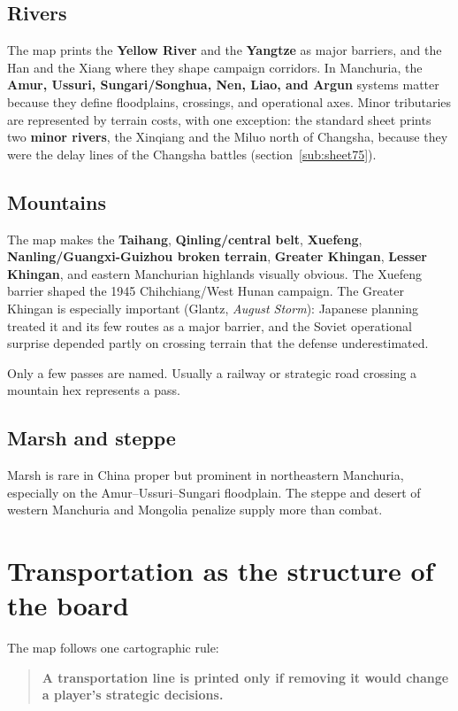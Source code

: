 \documentclass[11pt]{article}
\begin{document}
\subsection{Rivers}
The map prints the \textbf{Yellow River} and the \textbf{Yangtze} as major barriers, and the Han and the Xiang where they shape campaign corridors. In Manchuria, the \textbf{Amur, Ussuri, Sungari/Songhua, Nen, Liao, and Argun} systems matter because they define floodplains, crossings, and operational axes. Minor tributaries are represented by terrain costs, with one exception: the standard sheet prints two \textbf{minor rivers}, the Xinqiang and the Miluo north of Changsha, because they were the delay lines of the Changsha battles (section~\ref{sub:sheet75}).

\subsection{Mountains}
The map makes the \textbf{Taihang}, \textbf{Qinling/central belt}, \textbf{Xuefeng}, \textbf{Nanling/Guangxi-Guizhou broken terrain}, \textbf{Greater Khingan}, \textbf{Lesser Khingan}, and eastern Manchurian highlands visually obvious. The Xuefeng barrier shaped the 1945 Chihchiang/West Hunan campaign. The Greater Khingan is especially important (Glantz, \emph{August Storm}): Japanese planning treated it and its few routes as a major barrier, and the Soviet operational surprise depended partly on crossing terrain that the defense underestimated.

Only a few passes are named. Usually a railway or strategic road crossing a mountain hex represents a pass.

\subsection{Marsh and steppe}
Marsh is rare in China proper but prominent in northeastern Manchuria, especially on the Amur--Ussuri--Sungari floodplain. The steppe and desert of western Manchuria and Mongolia penalize supply more than combat.

\section{Transportation as the structure of the board}
The map follows one cartographic rule:
\begin{quote}\textbf{A transportation line is printed only if removing it would change a player's strategic decisions.}\end{quote}
\end{document}
